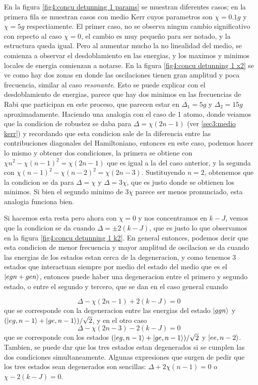 En la figura \ref{fig4:concu detunning 1 params} se muestran diferentes casos; en la primera fila se muestran casos con medio Kerr cuyos parametros son $\chi=0.1g$ y $\chi=5g$ respectiamente. El primer caso, no se observa ningun cambio significativo con repecto al caso $\chi=0$, el cambio es muy pequeño para ser notado, y la estructura queda igual. Pero al aumentar mucho la no linealidad del medio, se comienza a observar el desdoblamiento en las energias, y los maximos y minimos locales de energia comienzan a notarse. En la figura \ref{fig4:concu detunning 1 x2} se ve como hay dos zonas en donde las oscilaciones tienen gran amplitud y poca frecuencia, similar al caso \textit{resonante}. Esto se puede explicar con el desdoblamiento de energias, parece que hay dos minimos en las frecuencias de Rabi que participan en este proceso, que parecen estar en $\Delta_1=5g$ y $\Delta_2=15g$ aproximadamente. Haciendo una analogia con el caso de 1 atomo, donde veiamos que la condicion de robustez se daba para $\Delta=\chi(2n-1)$ (ver \ref{sec3:medio kerr}) y recordando que esta condicion sale de la diferencia entre las contribuciones diagonales del Hamiltoniano, entonces en este caso, podemos hacer lo mismo y obtener dos condiciones, la primera se obtiene con $\chi n^2-\chi(n-1)^2=\chi(2n-1)$ que es igual a la del caso anterior, y la segunda con $\chi(n-1)^2-\chi(n-2)^2=\chi(2n-3)$. Sustituyendo $n=2$, obtenemos que la condicion se da para $\Delta=\chi$ y $\Delta=3\chi$, que es justo donde se obtienen los minimos. Si bien el segundo minimo de $3\chi$ parece ser menos pronunciado, esta analogia funciona bien.

Si hacemos esta resta pero ahora con $\chi=0$ y nos concentramos en $k-J$, vemos que la condicion se da cuando $\Delta=\pm 2(k-J)$, que es justo lo que observamos en la figura \ref{fig4:concu detunning 1 k2}. En general entonces, podemos decir que esta condicion de menor frecuencia y mayor amplitud de oscilacion se da cuando las energias de los estados estan cerca de la degeneracion, y como tenemos 3 estados que interactuan siempre por medio del estado del medio que es el $\ket{egn+gen}$, entonces puede haber una degeneracion entre el primero y segundo estado, o entre el segundo y tercero, que se dan en el caso general cuando

\begin{equation}
    \Delta-\chi(2n-1)+2(k-J)=0
    \label{ec4:condicion 1}
\end{equation}
que se corresponde con la degeneracion entre las energias del estado $\ket{ggn}$ y $(\ket{eg,n-1}+\ket{ge,n-1})/\sqrt{2}$, y en el otro caso
\begin{equation}
    \Delta-\chi(2n-3)-2(k-J)=0
    \label{ec4:condicion 2}
\end{equation}
que se corresponde con los estados $(\ket{eg,n-1}+\ket{ge,n-1})/\sqrt{2}$ y $\ket{ee,n-2}$. Tambien, se puede dar que los tres estados estan degenerados si se cumplen las dos condiciones simultaneamente.
Algunas expresiones que surgen de pedir que los tres estados sean degenerados son sencillas: $\Delta+2\chi(n-1)=0$ o $\chi-2(k-J)=0$.

